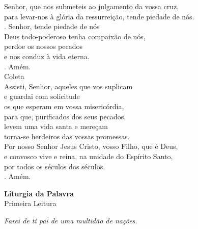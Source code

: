 \documentclass{book}
\begin{document}
\begin{flushleft}
    Senhor, que nos submeteis ao julgamento da vossa cruz, \\
    para levar-nos à glória da ressurreição,
    tende piedade de nós. \\
    {\color{VioletRed2} \Rbar.} Senhor, tende piedade de nós
    \vspace{.2cm} \\
    Deus todo-poderoso tenha compaixão de nós, \\
    perdoe os nossos pecados \\
    e nos conduz à vida eterna. \\
    {\color{VioletRed2} \Rbar.} Amém.
    \vspace{.2cm} \\
    \textcolor{VioletRed2}{Coleta}
    \vspace{.2cm} \\
    Assisti, Senhor, aqueles que vos suplicam \\
    e guardai com solicitude \\
    os que esperam em vossa misericórdia, \\
    para que, purificados dos seus pecados, \\
    levem uma vida santa e mereçam  \\
    torna-se herdeiros das vossas promessas. \\
    Por nosso Senhor Jesus Cristo, vosso Filho, que é Deus, \\
    e convosco vive e reina, na unidade do Espírito Santo, \\
    por todos os séculos dos séculos. \\
    {\color{VioletRed2} \Rbar.} Amém. \\
\end{flushleft}
\begin{center}
    \textbf{Liturgia da Palavra}
    \vspace{.2cm}\\
    \textcolor{VioletRed2}{Primeira Leitura}
\end{center}
\begin{flushright}
    \textit{Farei de ti pai de uma multidão de nações.}
\end{flushright}
\end{document}

